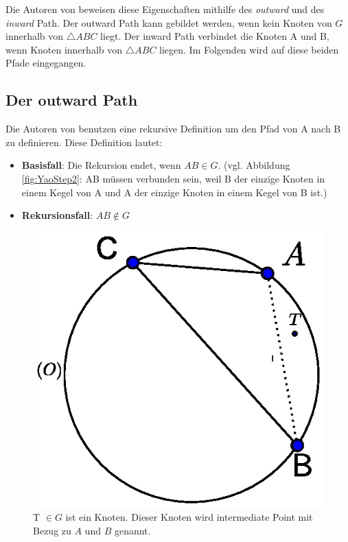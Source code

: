 \documentclass[a4paper,twoside]{IEEEtran}
\begin{document}
Die Autoren von \cite{kanj} beweisen diese Eigenschaften mithilfe des \emph{outward} und des \emph{inward} Path. %
Der outward Path kann gebildet werden, wenn kein Knoten von $G $ innerhalb von $\triangle {ABC} $ liegt.
Der inward Path verbindet die Knoten A und B, wenn Knoten innerhalb von $\triangle {ABC} $ liegen.
Im Folgenden wird auf diese beiden Pfade eingegangen.

\subsection{Der outward Path}
Die Autoren von \cite{kanj} benutzen eine rekursive Definition um den Pfad von A nach B zu definieren. 
Diese Definition lautet:

\begin{itemize}
\item \textbf{Basisfall}: Die Rekursion endet, wenn $AB \in G $. (vgl. Abbildung \ref{fig:YaoStep2}: AB müssen verbunden sein, weil B der einzige Knoten in einem Kegel von A  und A der einzige Knoten in einem Kegel von B ist.)
\item \textbf{Rekursionsfall}: $AB \notin G $
\end{itemize}

\begin{figure}[h!]
\centering
\includegraphics[width=1\linewidth]{outward_path1.eps}
\caption{T $\in G $ ist ein Knoten. Dieser Knoten wird intermediate Point mit Bezug zu $A $ und $B $ genannt.}
\label{fig:intermediate}
\end{figure}
\end{document}
